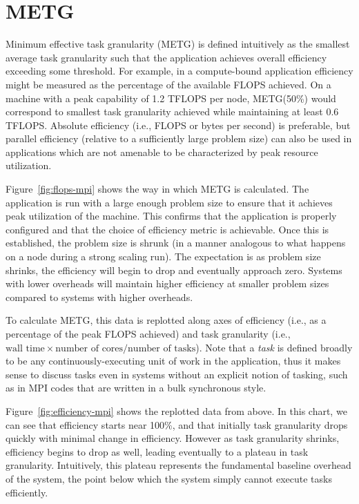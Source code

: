 \section{METG}
\label{sec:metg}




Minimum effective task granularity (METG) is defined intuitively as
the smallest average task granularity such that the application
achieves overall efficiency exceeding some threshold. For example, in
a compute-bound application efficiency might be measured as the
percentage of the available FLOPS achieved. On a machine with a peak
capability of 1.2 TFLOPS per node, METG(50\%) would correspond to
smallest task granularity achieved while maintaining at least 0.6
TFLOPS. Absolute efficiency (i.e., FLOPS or bytes per second) is
preferable, but parallel efficiency (relative to a sufficiently large
problem size) can also be used in applications which are not amenable
to be characterized by peak resource utilization.

Figure~\ref{fig:flops-mpi} shows the way in which METG is
calculated. The application is run with a large enough problem size to
ensure that it achieves peak utilization of the machine. This confirms
that the application is properly configured and that the choice of
efficiency metric is achievable. Once this is established, the problem
size is shrunk (in a manner analogous to what happens on a node during
a strong scaling run). The expectation is as problem size shrinks, the
efficiency will begin to drop and eventually approach zero. Systems
with lower overheads will maintain higher efficiency at smaller
problem sizes compared to systems with higher overheads.

To calculate METG, this data is replotted along axes of efficiency
(i.e., as a percentage of the peak FLOPS achieved) and task
granularity (i.e., $\text{wall time} \times \text{number of
  cores}/\text{number of tasks}$). Note that a \emph{task} is defined
broadly to be any continuously-executing unit of work in the
application, thus it makes sense to discuss tasks even in systems
without an explicit notion of tasking, such as in MPI codes that are written in
a bulk synchronous style.

Figure~\ref{fig:efficiency-mpi}
shows the replotted data from above. In this chart, we can see that
efficiency starts near 100\%, and that initially task granularity
drops quickly with minimal change in efficiency. However as task
granularity shrinks, efficiency begins to drop as well, leading
eventually to a plateau in task granularity. Intuitively, this plateau
represents the fundamental baseline overhead of the system, the point
below which the system simply cannot execute tasks efficiently.

